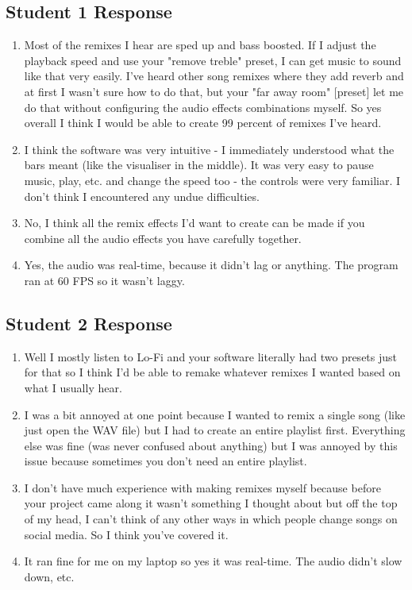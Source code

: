 \subsection{Student 1 Response}
\begin{enumerate}
	\item Most of the remixes I hear are sped up and bass boosted. If I adjust the playback speed and use your "remove treble" preset, I can get music to sound like that very easily. I've heard other song remixes where they add reverb and at first I wasn't sure how to do that, but your "far away room" [preset] let me do that without configuring the audio effects combinations myself. So yes overall I think I would be able to create 99 percent of remixes I've heard.
	\item I think the software was very intuitive - I immediately understood what the bars meant (like the visualiser in the middle). It was very easy to pause music, play, etc. and change the speed too - the controls were very familiar. I don't think I encountered any undue difficulties.
	\item No, I think all the remix effects I'd want to create can be made if you combine all the audio effects you have carefully together.
	\item Yes, the audio was real-time, because it didn't lag or anything. The program ran at 60 FPS so it wasn't laggy.
\end{enumerate}

\subsection{Student 2 Response}
\begin{enumerate}
	\item Well I mostly listen to Lo-Fi and your software literally had two presets just for that so I think I'd be able to remake whatever remixes I wanted based on what I usually hear.
	\item I was a bit annoyed at one point because I wanted to remix a single song (like just open the WAV file) but I had to create an entire playlist first. Everything else was fine (was never confused about anything) but I was annoyed by this issue because sometimes you don't need an entire playlist. 
	\item I don't have much experience with making remixes myself because before your project came along it wasn't something I thought about but off the top of my head, I can't think of any other ways in which people change songs on social media. So I think you've covered it.
	\item It ran fine for me on my laptop so yes it was real-time. The audio didn't slow down, etc.
\end{enumerate}

